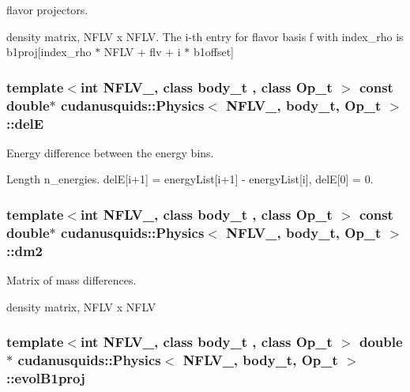 flavor projectors. 

density matrix, N\+F\+LV x N\+F\+LV. The i-\/th entry for flavor basis f with index\+\_\+rho is b1proj\mbox{[}index\+\_\+rho $\ast$ N\+F\+LV + flv + i $\ast$ b1offset\mbox{]} 
\subsubsection[{\texorpdfstring{delE}{delE}}]{\setlength{\rightskip}{0pt plus 5cm}template$<$int N\+F\+L\+V\+\_\+, class body\+\_\+t , class Op\+\_\+t $>$ const double$\ast$ {\bf cudanusquids\+::\+Physics}$<$ N\+F\+L\+V\+\_\+, body\+\_\+t, Op\+\_\+t $>$\+::delE}\hypertarget{structcudanusquids_1_1Physics_af81e038971a9c70768911241647b73f5}{}\label{structcudanusquids_1_1Physics_af81e038971a9c70768911241647b73f5}


Energy difference between the energy bins. 

Length n\+\_\+energies. delE\mbox{[}i+1\mbox{]} = energy\+List\mbox{[}i+1\mbox{]} -\/ energy\+List\mbox{[}i\mbox{]}, delE\mbox{[}0\mbox{]} = 0. 
\subsubsection[{\texorpdfstring{dm2}{dm2}}]{\setlength{\rightskip}{0pt plus 5cm}template$<$int N\+F\+L\+V\+\_\+, class body\+\_\+t , class Op\+\_\+t $>$ const double$\ast$ {\bf cudanusquids\+::\+Physics}$<$ N\+F\+L\+V\+\_\+, body\+\_\+t, Op\+\_\+t $>$\+::dm2}\hypertarget{structcudanusquids_1_1Physics_a1a7778a672f21550ef4786acc2c01aab}{}\label{structcudanusquids_1_1Physics_a1a7778a672f21550ef4786acc2c01aab}


Matrix of mass differences. 

density matrix, N\+F\+LV x N\+F\+LV 
\subsubsection[{\texorpdfstring{evol\+B1proj}{evolB1proj}}]{\setlength{\rightskip}{0pt plus 5cm}template$<$int N\+F\+L\+V\+\_\+, class body\+\_\+t , class Op\+\_\+t $>$ double$\ast$ {\bf cudanusquids\+::\+Physics}$<$ N\+F\+L\+V\+\_\+, body\+\_\+t, Op\+\_\+t $>$\+::evol\+B1proj}\hypertarget{structcudanusquids_1_1Physics_a1e8bf327f8744c94ed63272041b41d34}{}\label{structcudanusquids_1_1Physics_a1e8bf327f8744c94ed63272041b41d34}


